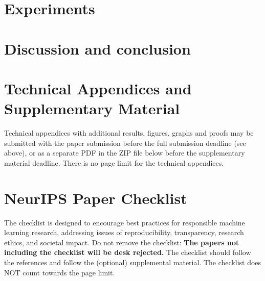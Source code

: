 \documentclass{article}
\begin{document}
\section{Experiments}
\label{sec:experiments}



\section{Discussion and conclusion}
\label{sec:conclusion}








\appendix

\section{Technical Appendices and Supplementary Material}
Technical appendices with additional results, figures, graphs and proofs may be submitted with the paper submission before the full submission deadline (see above), or as a separate PDF in the ZIP file below before the supplementary material deadline. There is no page limit for the technical appendices.


\newpage
\section*{NeurIPS Paper Checklist}

The checklist is designed to encourage best practices for responsible machine learning research, addressing issues of reproducibility, transparency, research ethics, and societal impact. Do not remove the checklist: {\bf The papers not including the checklist will be desk rejected.} The checklist should follow the references and follow the (optional) supplemental material.  The checklist does NOT count towards the page
limit. 
\end{document}
